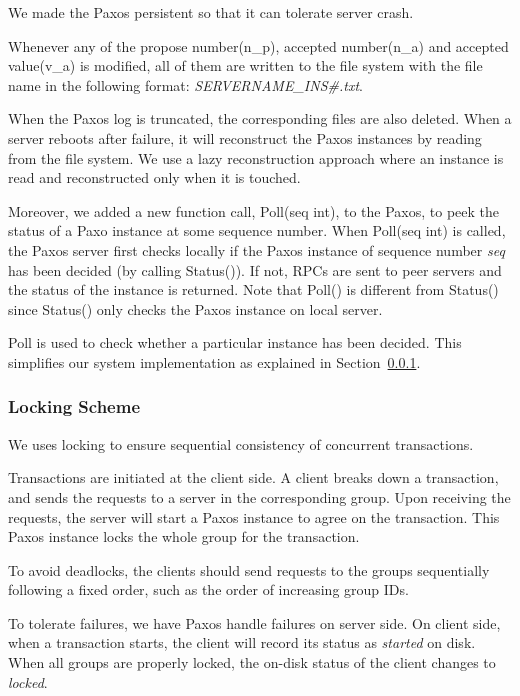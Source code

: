 \documentclass{vldb}
\begin{document}
We made the Paxos persistent so that it can tolerate server crash.

Whenever any of the propose number(n\_p), accepted number(n\_a) and accepted
value(v\_a) is modified, all of them are written to the file system with the file
name in the following format: \textit{SERVERNAME\_INS\#.txt}.

When the Paxos log is truncated, the corresponding files are also deleted. When a
server reboots after failure, it will reconstruct the Paxos instances by reading from
the file system. We use a lazy reconstruction approach where an instance is read and
reconstructed only when it is touched.

Moreover, we added a new function call, Poll(seq int), to the Paxos, to peek the
status of a Paxo instance at some sequence number. When Poll(seq int) is called, the
Paxos server first checks locally if the Paxos instance of sequence number
\textit{seq} has been decided (by calling Status()). If not, RPCs are sent to peer
servers and the status of the instance is returned. Note that Poll() is different
from Status() since Status() only checks the Paxos instance on local server.

Poll is used to check whether a particular instance has been decided. This simplifies
our system implementation as explained in Section~\ref{sec:lock}.


\subsubsection{Locking Scheme}
\label{sec:lock}

We uses locking to ensure sequential consistency of concurrent transactions.

Transactions are initiated at the client side. A client breaks down a transaction,
and sends the requests to a server in the corresponding group. Upon receiving the
requests, the server will start a Paxos instance to agree on the transaction. This
Paxos instance locks the whole group for the transaction.

To avoid deadlocks, the clients should send requests to the groups sequentially
following a fixed order, such as the order of increasing group IDs.

To tolerate failures, we have Paxos handle failures on server side. On client side,
when a transaction starts, the client will record its status as \textit{started} on
disk. When all groups are properly locked, the on-disk status of the client changes
to \textit{locked}.
\end{document}
